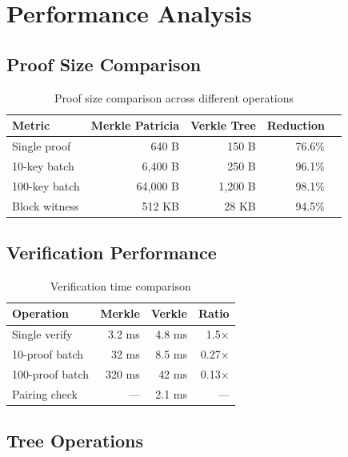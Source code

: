 \section{Performance Analysis}


\subsection{Proof Size Comparison}

\begin{table}[H]
\centering
\begin{tabular}{@{}lrrrr@{}}
\toprule
\textbf{Metric} & \textbf{Merkle Patricia} & \textbf{Verkle Tree} & \textbf{Reduction} \\
\midrule
Single proof & 640 B & 150 B & 76.6\% \\
10-key batch & 6,400 B & 250 B & 96.1\% \\
100-key batch & 64,000 B & 1,200 B & 98.1\% \\
Block witness & 512 KB & 28 KB & 94.5\% \\
\bottomrule
\end{tabular}
\caption{Proof size comparison across different operations}
\label{tab:proof-sizes}
\end{table}

\subsection{Verification Performance}

\begin{table}[H]
\centering
\begin{tabular}{@{}lrrr@{}}
\toprule
\textbf{Operation} & \textbf{Merkle} & \textbf{Verkle} & \textbf{Ratio} \\
\midrule
Single verify & 3.2 ms & 4.8 ms & 1.5× \\
10-proof batch & 32 ms & 8.5 ms & 0.27× \\
100-proof batch & 320 ms & 42 ms & 0.13× \\
Pairing check & — & 2.1 ms & — \\
\bottomrule
\end{tabular}
\caption{Verification time comparison}
\label{tab:verification-time}
\end{table}

\subsection{Tree Operations}

